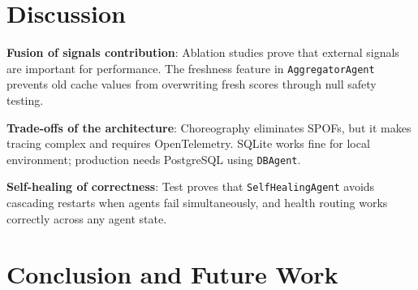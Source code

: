 ﻿\documentclass[runningheads]{llncs}
\begin{document}
\begin{table}[H]
\caption{Architectural Comparison with Related Systems}
\label{tab:comparison}
\centering\small
{}
\end{table}

\section{Discussion}
\label{sec:discussion}

\textbf{Fusion of signals contribution}: Ablation studies prove that external signals are important for performance. The freshness feature in \texttt{AggregatorAgent} prevents old cache values from overwriting fresh scores through null safety testing.

\textbf{Trade-offs of the architecture}: Choreography eliminates SPOFs, but it makes tracing complex and requires OpenTelemetry. SQLite works fine for local environment; production needs PostgreSQL using \texttt{DBAgent}.

\textbf{Self-healing of correctness}: Test proves that \texttt{SelfHealingAgent} avoids cascading restarts when agents fail simultaneously, and health routing works correctly across any agent state.

\section{Conclusion and Future Work}
\label{sec:conclusion}
\end{document}
